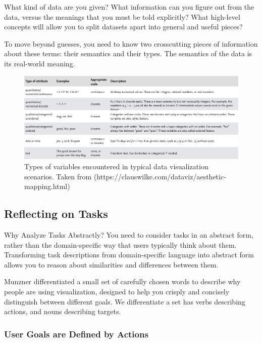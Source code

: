 \documentclass[
]{book}
\begin{document}
What kind of data are you given? What information can you figure out from the data, versus the meanings that you must be told explicitly? What high-level concepts will allow you to split datasets apart into general and useful pieces?

To move beyond guesses, you need to know two crosscutting pieces of information about these terms: their semantics and their types. The semantics of the data is its real-world meaning.

\begin{figure}

{\centering \includegraphics[width=1\linewidth]{images/attribute_types} 

}

\caption{Types of variables encountered in typical data visualization scenarios. Taken from (https://clauswilke.com/dataviz/aesthetic-mapping.html)}\label{fig:unnamed-chunk-5}
\end{figure}

\hypertarget{reflecting-on-tasks}{%
\subsection{Reflecting on Tasks}\label{reflecting-on-tasks}}

Why Analyze Tasks Abstractly? You need to consider tasks in an abstract form, rather than the domain-specific way that users typically think about them. Transforming task descriptions from domain-specific language into abstract form allows you to reason about similarities and differences between them.

Munzner \citep{munzner2014visualization} differentiated a small set of carefully chosen words to describe why people are using visualization, designed to help you crisply and concisely distinguish between different goals. We differentiate a set has verbs describing actions, and nouns describing targets.

\hypertarget{user-goals-are-defined-by-actions}{%
\subsubsection{User Goals are Defined by Actions}\label{user-goals-are-defined-by-actions}}
\end{document}
